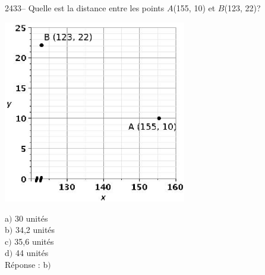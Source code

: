 \documentclass[letterpaper, 12pt]{article}
\begin{document}
2433-- Quelle est la distance entre les points $A$(155, 10) et $B$(123, 22)?\\
\begin{center}
 \includegraphics[width=8cm,bb=14 14 415 415]{Q2433q.eps}
\end{center}

a$)$  30 unit\'es\\
b$)$  34,2 unit\'es\\
c$)$  35,6 unit\'es\\
d$)$  44 unit\'es\\

R\'eponse : b$)$ \\
\end{document}
